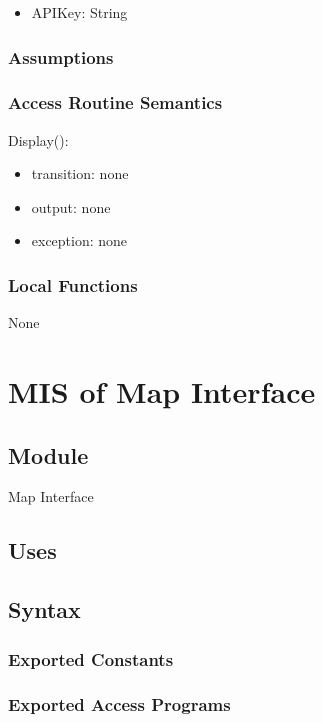 \documentclass[12pt, titlepage]{article}
\begin{document}
\begin{itemize}
\item APIKey: String
\end{itemize}

\subsubsection{Assumptions}

\subsubsection{Access Routine Semantics}

\noindent Display():
\begin{itemize}
\item transition: none
\item output: none
\item exception: none
\end{itemize}

\subsubsection{Local Functions}

None

\newpage

\section{MIS of Map Interface} \label{mMapInterface}

\subsection{Module}

Map Interface

\subsection{Uses}

\subsection{Syntax}

\subsubsection{Exported Constants}

\subsubsection{Exported Access Programs}
\end{document}
